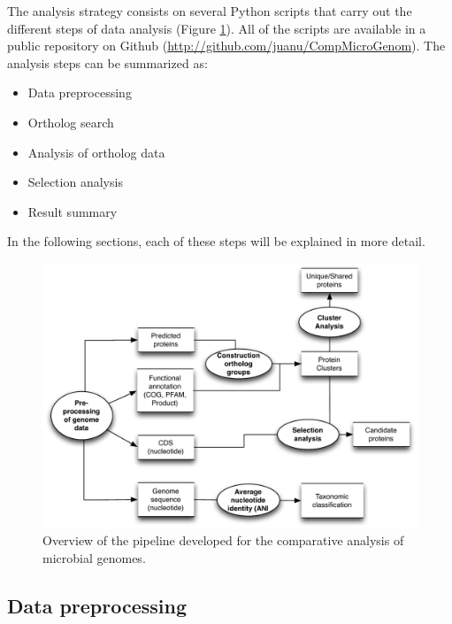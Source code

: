 The analysis strategy consists on several Python scripts that carry out the different steps of data analysis (Figure \ref{CompGenomePipeline}). All of the scripts are available in a public repository on Github (\url{http://github.com/juanu/CompMicroGenom}). The analysis steps can be summarized as:

\begin{itemize}
\item Data preprocessing
\item Ortholog search
\item Analysis of ortholog data
\item Selection analysis
\item Result summary
\end{itemize}

In the following sections, each of these steps will be explained in more detail.

\begin{figure}[htbp]
	\centering
	\includegraphics[width=\textwidth]{Chapter6/Figures/WorkflowOverview.pdf}
	\caption[Overview of the pipeline developed for the comparative analysis of microbial genomes]{Overview of the pipeline developed for the comparative analysis of microbial genomes.}
	\label{CompGenomePipeline}
\end{figure}

\subsection{Data preprocessing}

